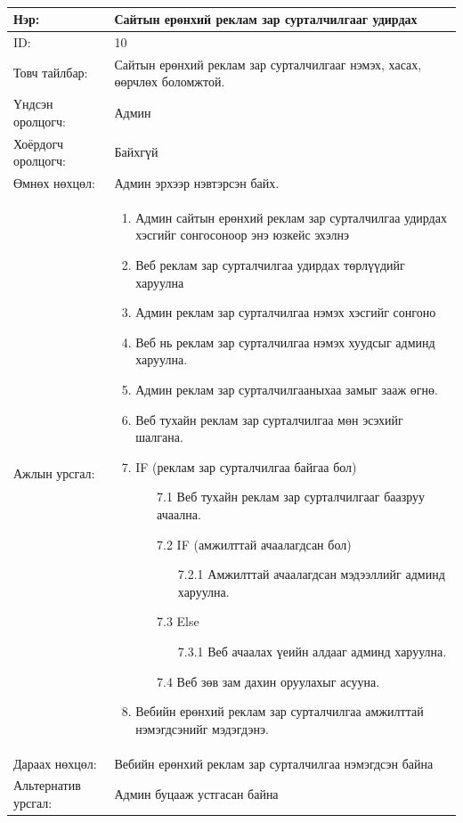 \begin{center}
	\begin{table}[!htbp]
		\caption{}
		\begin{tabular}{|p{4cm}|p{11cm}|}
			\hline
			Нэр: & Сайтын ерөнхий реклам зар сурталчилгааг удирдах  \\
			\hline
			ID: & 10 \\
			\hline
			Товч тайлбар: & Сайтын ерөнхий реклам зар сурталчилгааг нэмэх, хасах, өөрчлөх боломжтой.  \\
			\hline
			Үндсэн оролцогч: & Админ \\
			\hline
			Хоёрдогч оролцогч: & Байхгүй  \\
			\hline
			Өмнөх нөхцөл: &  Админ эрхээр нэвтэрсэн байх. \\
			\hline
			Ажлын урсгал: & \begin{enumerate}
								\item Админ сайтын ерөнхий реклам зар сурталчилгаа удирдах хэсгийг сонгосоноор энэ юзкейс эхэлнэ
								\item Веб реклам зар сурталчилгаа удирдах төрлүүдийг харуулна
								\item Админ реклам зар сурталчилгаа нэмэх хэсгийг сонгоно
								\item Веб нь реклам зар сурталчилгаа нэмэх хуудсыг админд харуулна.
								\item Админ реклам зар сурталчилгааныхаа замыг зааж өгнө.
								\item Веб тухайн реклам зар сурталчилгаа мөн эсэхийг шалгана.
								\item IF (реклам зар сурталчилгаа байгаа бол)
									\begin{enumerate}
										\item[7.1] Веб тухайн реклам зар сурталчилгааг баазруу ачаална.
										\item[7.2] IF (амжилттай ачаалагдсан бол)
											\begin{enumerate}
												\item[7.2.1] Амжилттай ачаалагдсан мэдээллийг админд харуулна. 
											\end{enumerate}
										\item[7.3] Else
											\begin{enumerate}
												\item[7.3.1] Веб ачаалах үеийн алдааг админд харуулна. 
											\end{enumerate}
										\item[7.4] Веб зөв зам дахин оруулахыг асууна.
									\end{enumerate}
								\item Вебийн ерөнхий реклам зар сурталчилгаа амжилттай нэмэгдсэнийг мэдэгдэнэ.
						\end{enumerate}	\\
					\hline
			Дараах нөхцөл: & Вебийн ерөнхий реклам зар сурталчилгаа нэмэгдсэн байна \\
			\hline
			Альтернатив урсгал: & Админ буцааж устгасан байна \\
			\hline
		\end{tabular}
	\end{table}
\end{center}
